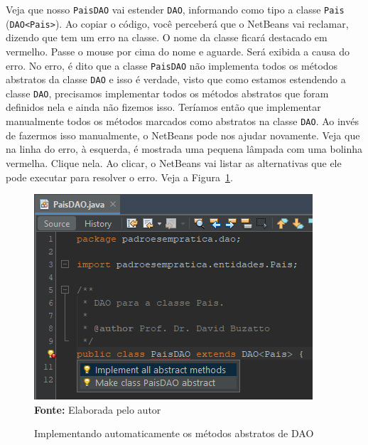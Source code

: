 Veja que nosso \texttt{PaisDAO} vai estender \texttt{DAO}, informando como tipo a classe \texttt{Pais} (\texttt{DAO<Pais>}). Ao copiar o código, você perceberá que o NetBeans vai reclamar, dizendo que tem um erro na classe. O nome da classe ficará destacado em vermelho. Passe o mouse por cima do nome e aguarde. Será exibida a causa do erro. No erro, é dito que a classe \texttt{PaisDAO} não implementa todos os métodos abstratos da classe \texttt{DAO} e isso é verdade, visto que como estamos estendendo a classe \texttt{DAO}, precisamos implementar todos os métodos abstratos que foram definidos nela e ainda não fizemos isso. Teríamos então que implementar manualmente todos os métodos marcados como abstratos na classe \texttt{DAO}. Ao invés de fazermos isso manualmente, o NetBeans pode nos ajudar novamente. Veja que na linha do erro, à esquerda, é mostrada uma pequena lâmpada com uma bolinha vermelha. Clique nela. Ao clicar, o NetBeans vai listar as alternativas que ele pode executar para resolver o erro. Veja a Figura~\ref{fig:cap04ImplementacaoAutomatica}.

\FloatBarrier
\begin{figure}[!htbp]
    \centering
    \caption{Implementando automaticamente os métodos abstratos de DAO}
    \includegraphics[scale=1]{imagens/cap04ImplementacaoAutomatica}
    \\\textbf{Fonte:} Elaborada pelo autor
    \label{fig:cap04ImplementacaoAutomatica}
\end{figure}
\FloatBarrier


